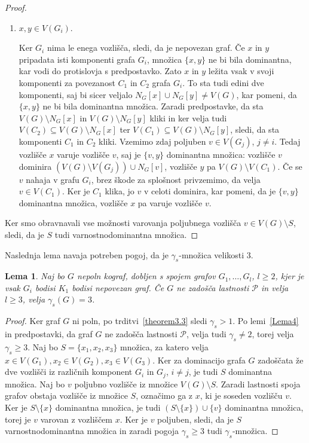 \documentclass[12pt,a4paper,twoside]{article}
\theoremstyle{definition} %
\theoremstyle{plain} %
\newtheorem{lema}[definicija]{Lema}
\numberwithin{equation}{section}  %
\begin{document}
\begin{proof}
\begin{enumerate}[label=($\roman*$)]
\item $x,y \in V(G_i)$.

Ker $G_i$ nima le enega vozlišča, sledi, da je nepovezan graf. Če $x$ in $y$ pripadata isti komponenti grafa $G_i$, množica $\{x, y\}$ ne bi bila dominantna, kar vodi do protislovja s predpostavko. Zato $x$ in $y$ ležita vsak v svoji komponenti za povezanost $C_1$ in $C_2$ grafa $G_i$. To sta tudi edini dve komponenti, saj bi sicer veljalo  $N_G[x] \cup N_G[y] \neq V(G)$, kar pomeni, da $\{x, y\}$ ne bi bila dominantna množica. Zaradi predpostavke, da sta $V(G) \setminus N_G[x]$ in $V(G) \setminus N_G[y]$ kliki in ker velja tudi $V(C_2) \subseteq V(G) \setminus N_G[x]$ ter $V(C_1) \subseteq V(G) \setminus N_G[y]$, sledi, da sta komponenti $C_1$ in $C_2$ kliki.
Vzemimo zdaj poljuben $v \in V(G_j)$, $j \neq i$. Tedaj vozlišče $x$ varuje vozlišče $v$, saj je $\{v, y\}$ dominantna množica: vozlišče $v$ dominira $(V(G) \setminus V(G_j)) \cup N_G[v]$, vozlišče $y$ pa $V(G) \setminus V(C_1)$. Če se $v$ nahaja v grafu $G_i$, brez škode za splošnost privzemimo, da velja $v \in V(C_1)$. Ker je $C_1$ klika, jo $v$ v celoti dominira, kar pomeni, da je $\{v, y\}$ dominantna množica, vozlišče $x$ pa varuje vozlišče $v$.
\end{enumerate}

Ker smo obravnavali vse možnosti varovanja poljubnega vozlišča $v \in V(G) \setminus S$, sledi, da je $S$ tudi varnostnodominantna množica.
\end{proof}

Naslednja lema navaja potreben pogoj, da je $\gamma_s$-množica velikosti 3.

\begin{lema}\label{Lema5}
Naj bo $G$ nepoln kograf, dobljen s spojem grafov $G_1, \dots, G_l$, $l \geq 2$, kjer je vsak $G_i$ bodisi $K_1$ bodisi nepovezan graf. Če $G$ ne zadošča lastnosti $\mathcal{P}$ in velja $l \geq 3$, velja $\gamma_s(G) = 3$. 
\end{lema}
\begin{proof}
Ker graf $G$ ni poln, po trditvi~\ref{theorem3.3} sledi $\gamma_s > 1$. Po lemi~\ref{Lema4} in predpostavki, da graf $G$ ne zadošča lastnosti $\mathcal{P}$, velja tudi $\gamma_s \neq 2$, torej velja $\gamma_s \geq 3$.  Naj bo $S= \{x_1,x_2,x_3\}$ množica, za katero velja $x \in V(G_1),  x_2 \in V(G_2),  x_3 \in V(G_3)$. Ker za dominacijo grafa $G$ zadoščata že dve vozlišči iz različnih komponent $G_i$ in $G_j$, $i \neq j$, je tudi $S$ dominantna množica. Naj bo $v$ poljubno vozlišče iz množice $V(G) \setminus S$. Zaradi lastnosti spoja grafov obstaja vozlišče iz množice $S$, označimo ga z $x$, ki je soseden vozlišču $v$. Ker je $S \setminus \{x\}$ dominantna množica, je tudi $(S \setminus \{x\}) \cup \{v\}$ dominantna množica, torej je $v$ varovan z vozliščem $x$. Ker je $v$ poljuben, sledi, da je $S$ varnostnodominantna množica in zaradi pogoja  $\gamma_s \geq 3$ tudi $\gamma_s$-množica.
\end{proof}
\end{document}
